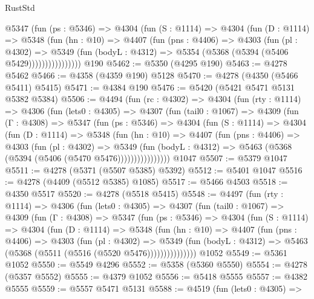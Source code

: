 \begin{lexlean}{RustStd}
\begin{coremodule}
{\begin{coremodule}
{{{{{{{{{{{{{{{{{{{{{{{{{{{{{{{{{{{              @5347
                (fun (ps : @5346) =>
                @4304
                  (fun (S : @1114) =>
                  @4304
                    (fun (D : @1114) =>
                    @5348
                      (fun (hn : @10) =>
                      @4407
                        (fun (pns : @4406) =>
                        @4303
                          (fun (pl : @4302) =>
                          @5349
                            (fun (bodyL : @4312) => @5354 (@5368 (@5394 (@5406 @5429))))))))))))))))
    @190
@5462 := @5350 (@4295 @190)
@5463 := @4278 @5462
@5466 := @4358 (@4359 @190) @5128
@5470 := @4278 (@4350 (@5466 @5411) @5415)
@5471 := @4384 @190
@5476 := @5420 (@5421 @5471 @5131 @5382 @5384)
@5506 := @4494
    (fun (rc : @4302) =>
    @4304
      (fun (rty : @1114) =>
      @4306
        (fun (lets0 : @4305) =>
        @4307
          (fun (tail0 : @1067) =>
          @4309
            (fun (Γ : @4308) =>
            @5347
              (fun (ps : @5346) =>
              @4304
                (fun (S : @1114) =>
                @4304
                  (fun (D : @1114) =>
                  @5348
                    (fun (hn : @10) =>
                    @4407
                      (fun (pns : @4406) =>
                      @4303
                        (fun (pl : @4302) =>
                        @5349
                          (fun (bodyL : @4312) =>
                          @5463 (@5368 (@5394 (@5406 (@5470 @5476))))))))))))))))
    @1047
@5507 := @5379 @1047
@5511 := @4278 (@5371 (@5507 @5385) @5392)
@5512 := @5401 @1047
@5516 := @4278 (@4409 (@5512 @5385) @1085)
@5517 := @5466 @4503
@5518 := @4350 @5517
@5520 := @4278 (@5518 @5415)
@5548 := @4497
    (fun (rty : @1114) =>
    @4306
      (fun (lets0 : @4305) =>
      @4307
        (fun (tail0 : @1067) =>
        @4309
          (fun (Γ : @4308) =>
          @5347
            (fun (ps : @5346) =>
            @4304
              (fun (S : @1114) =>
              @4304
                (fun (D : @1114) =>
                @5348
                  (fun (hn : @10) =>
                  @4407
                    (fun (pns : @4406) =>
                    @4303
                      (fun (pl : @4302) =>
                      @5349
                        (fun (bodyL : @4312) =>
                        @5463 (@5368 (@5511 (@5516 (@5520 @5476)))))))))))))))
    @1052
@5549 := @5361 @1052
@5550 := @5549 @4296
@5552 := @5358 (@5360 @5550)
@5554 := @4278 (@5357 @5552)
@5555 := @4379 @1052
@5556 := @5418 @5555
@5557 := @4382 @5555
@5559 := @5557 @5471 @5131
@5588 := @4519
    (fun (lets0 : @4305) =>
}}}}}}}}}}}}}}}}}}}}}}}}}}}}}}}}}}}
\end{coremodule}}
\end{coremodule}
\end{lexlean}
